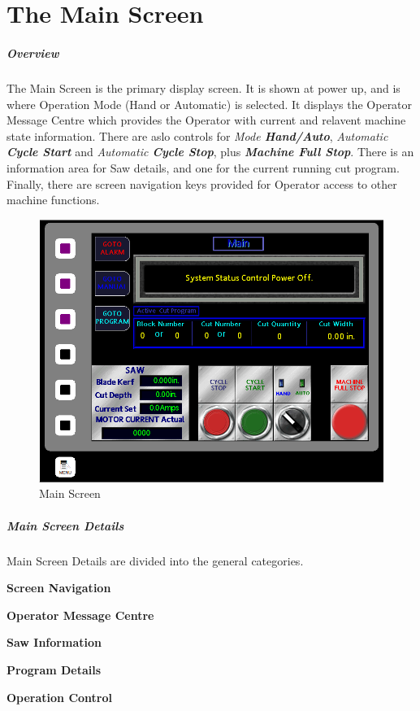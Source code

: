 \chapter{The Main Screen}
\paragraph{Overview}
The Main Screen is the primary display screen. It is shown at power up, and is where Operation Mode (Hand or Automatic) is selected. It displays the Operator Message Centre which provides the Operator with current and relavent machine state information. There are aslo controls for \textit{Mode \textbf{Hand/Auto}}, \textit{Automatic \textbf{Cycle Start}} and \textit{Automatic \textbf{Cycle Stop}}, plus \textbf{\textit{Machine Full Stop}}. There is an information area for Saw details, and one for the current running cut program. Finally, there are screen navigation keys provided for Operator access to other machine functions.
\begin{figure}
	\centering
	\includegraphics[width=0.5\linewidth]{screen-captures/main-screen}
	\caption{Main Screen}
	\label{fig:main-screen}
\end{figure}
\pagebreak
\paragraph{Main Screen Details}
Main Screen Details are divided into the general categories.
\begin{list}{-}{}
	\item \textbf{Screen Navigation}
	\item \textbf{Operator Message Centre}
	\item \textbf{Saw Information}
	\item \textbf{Program Details}
	\item \textbf{Operation Control}
\end{list}
